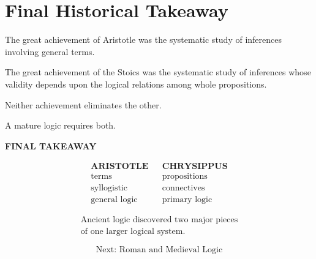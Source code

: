\documentclass[11pt]{article}
\begin{document}
\section{Final Historical Takeaway}

The great achievement of Aristotle was the systematic study of
inferences involving general terms.

The great achievement of the Stoics was the systematic study of
inferences whose validity depends upon the logical relations
among whole propositions.

Neither achievement eliminates the other.

A mature logic requires both.

\begin{whiteboard}
\textbf{FINAL TAKEAWAY}

\[
\begin{array}{ccc}
\textbf{ARISTOTLE}
&&
\textbf{CHRYSIPPUS}
\\
\text{terms}
&&
\text{propositions}
\\
\text{syllogistic}
&&
\text{connectives}
\\
\text{general logic}
&&
\text{primary logic}
\end{array}
\]

\vspace{0.8em}

\[
\boxed{
\begin{array}{c}
\text{Ancient logic discovered two major pieces}\\
\text{of one larger logical system.}
\end{array}
}
\]

\vspace{0.8em}

\[
\text{Next: Roman and Medieval Logic}
\]
\end{whiteboard}
\end{document}

